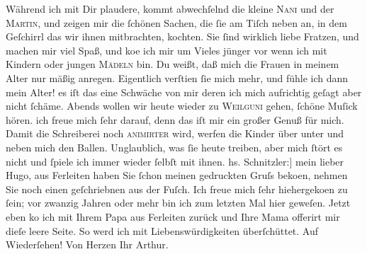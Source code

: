 \begin{ledgroupsized}[t]{13cm}
           \pstart
           Während ich mit Dir plaudere, kommt abwechſelnd die kleine \textsc{Nani} und der \textsc{Martin}, und zeigen mir die ſchönen Sachen, die ſie am Tiſch neben an, in dem Geſchirrl
               das {\pb}wir ihnen mitbrachten, kochten. Sie ſind wirklich
               liebe Fratzen, und machen mir viel Spaß, und ko{\geminationm}e ich
               mir um Vieles jünger vor wenn ich mit Kindern oder jungen \textsc{Mädeln} bin. Du weißt, daß mich die Frauen in meinem Alter nur mäßig anregen.
               Eigentlich verſti{\geminationm}en ſie mich mehr, und fühle ich dann
               mein Alter! es iſt das eine Schwäche von mir deren ich mich aufrichtig geſagt aber
               nicht ſchäme.\pend
           \pstart
           Abends wollen wir heute wieder zu \textsc{Weilguni} gehen, ſchöne Muſick hören. ich freue mich ſehr darauf, denn das iſt mir ein
               großer Genuß für mich.\pend
           \pstart
           Damit die Schreiberei noch \textsc{animirter} wird, werfen die
               Kinder über unter und neben mich den Ballen. Unglaublich, was ſie heute treiben, aber
               mich ſtört es nicht und ſpiele ich immer wieder ſelbſt mit ihnen. \pend
           {\bigskip}\pstart
           \noindent{}{\pb}{[}hs. Schnitzler:{]} mein lieber Hugo, aus Ferleiten haben Sie ſchon meinen gedruckten Gruſs beko{\geminationm}en, nehmen Sie noch einen geſchriebnen aus der Fuſch. Ich freue mich ſehr hiehergeko{\geminationm}en zu ſein; vor zwanzig Jahren oder mehr bin ich zum
               letzten Mal hier geweſen. Jetzt eben ko{\geminationm} ich mit Ihrem
                  Papa aus Ferleiten zurück und Ihre Mama offerirt mir dieſe leere Seite.
               So werd ich mit Liebenswürdigkeiten überſchüttet.\pend
           \pstart
           Auf Wiederſehen!\pend
           \pstart Von Herzen Ihr \spacefill\mbox{Arthur.}\pend{}          \endnumbering{}\end{ledgroupsized}  \newcommand{\dateiname}{L00824}\newcommand{\titel}{Anna von Hofmannsthal und Arthur Schnitzler an Hugo von Hofmannsthal, [19. 7. 1898]}\newcommand{\editorInnen}{Martin Anton Müller und Gerd-Hermann Susen}
      
